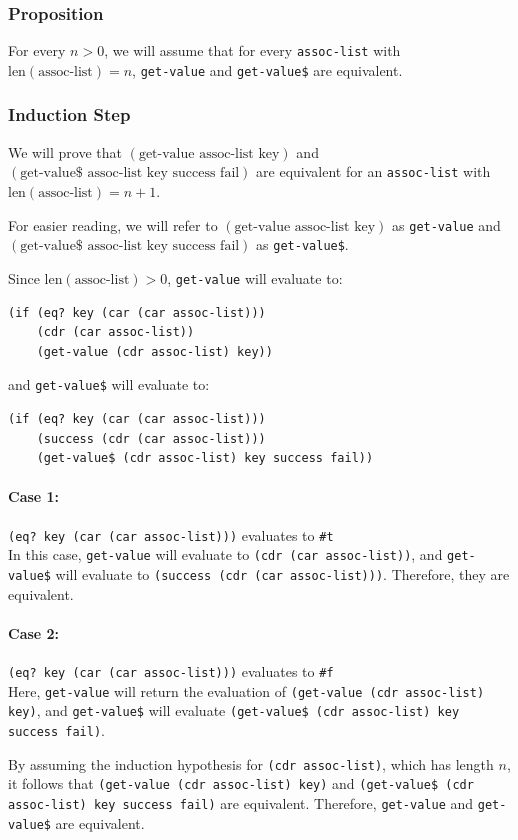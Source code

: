 \documentclass{article}
\begin{document}
\subsubsection*{Proposition}
For every \(n > 0\), we will assume that for every \texttt{assoc-list} with \(\text{len}(\text{assoc-list}) = n\), \texttt{get-value} and \texttt{get-value\$} are equivalent.

\subsubsection*{Induction Step}
We will prove that \((\text{get-value } \text{assoc-list } \text{key})\) and \((\text{get-value\$} \text{ assoc-list } \text{key } \text{success } \text{fail})\) are equivalent for an \texttt{assoc-list} with \(\text{len}(\text{assoc-list}) = n+1\).

For easier reading, we will refer to \((\text{get-value } \text{assoc-list } \text{key})\) as \texttt{get-value} and \((\text{get-value\$} \text{ assoc-list } \text{key } \text{success } \text{fail})\) as \texttt{get-value\$}.

Since \(\text{len}(\text{assoc-list}) > 0\), \texttt{get-value} will evaluate to:
\begin{verbatim}
(if (eq? key (car (car assoc-list)))
    (cdr (car assoc-list))
    (get-value (cdr assoc-list) key))
\end{verbatim}
and \texttt{get-value\$} will evaluate to:
\begin{verbatim}
(if (eq? key (car (car assoc-list)))
    (success (cdr (car assoc-list)))
    (get-value$ (cdr assoc-list) key success fail))
\end{verbatim}

\paragraph{Case 1:} \texttt{(eq? key (car (car assoc-list)))} evaluates to \texttt{\#t}\\
In this case, \texttt{get-value} will evaluate to \texttt{(cdr (car assoc-list))}, and \texttt{get-value\$} will evaluate to \texttt{(success (cdr (car assoc-list)))}. Therefore, they are equivalent.

\paragraph{Case 2:} \texttt{(eq? key (car (car assoc-list)))} evaluates to \texttt{\#f}\\
Here, \texttt{get-value} will return the evaluation of \texttt{(get-value (cdr assoc-list) key)}, and \texttt{get-value\$} will evaluate \texttt{(get-value\$ (cdr assoc-list) key success fail)}.

By assuming the induction hypothesis for \texttt{(cdr assoc-list)}, which has length \(n\), it follows that \texttt{(get-value (cdr assoc-list) key)} and \texttt{(get-value\$ (cdr assoc-list) key success fail)} are equivalent. Therefore, \texttt{get-value} and \texttt{get-value\$} are equivalent.
\end{document}
